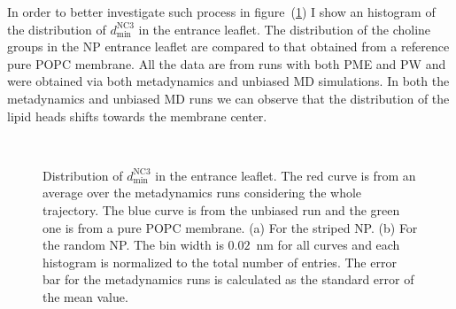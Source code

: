 In order to better investigate such process in figure~(\ref{fig:NC3minDist}) I show an histogram of the distribution of $d_\text{min}^{\text{NC}3}$ in the entrance leaflet. The distribution of the choline groups in the \ac{NP} entrance leaflet are compared to that obtained from a reference pure \ac{POPC} membrane. All the data are from runs with both \ac{PME} and \ac{PW} and were obtained via both metadynamics and unbiased \ac{MD} simulations. In both the metadynamics and unbiased \ac{MD} runs we can observe that the distribution of the lipid heads shifts towards the membrane center. 
\begin{figure}[h!p]
	\center
	\\%
	\caption{Distribution of $d_\text{min}^{\text{NC}3}$ in the entrance leaflet. The red curve is from an average over the metadynamics runs considering the whole trajectory. The blue curve is from the unbiased run and the green one is from a pure \acs{POPC} membrane. (a) For the striped \acs{NP}. (b) For the random \acs{NP}. The bin width is $0.02$~nm for all curves and each histogram is normalized to the total number of entries. The error bar for the metadynamics runs is calculated as the standard error of the mean value.}%
	\label{fig:NC3minDist}
\end{figure}
